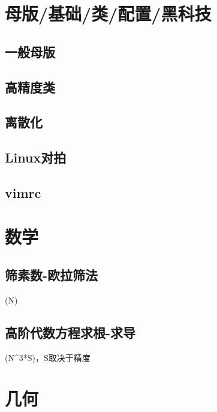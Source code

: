 \documentclass[10pt]{article}
\begin{document}
\tableofcontents
\newpage
\section{母版/基础/类/配置/黑科技}
\subsection{一般母版}

\subsection{高精度类}

\subsection{离散化}

\subsection{Linux对拍}

\subsection{vimrc}

\section{数学}
\subsection{筛素数-欧拉筛法}
(N)


\subsection{高阶代数方程求根-求导}
(N^3*S)，S取决于精度

\section{几何}
\end{document}
